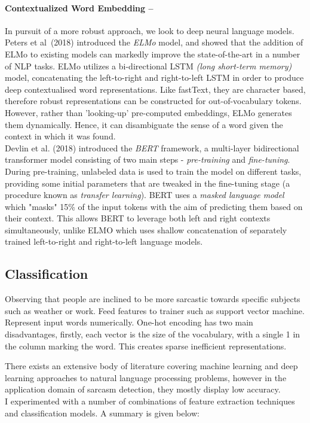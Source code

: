 \documentclass[12pt,a4paper]{article}
\begin{document}
\paragraph{Contextualized Word Embedding --}
In pursuit of a more robust approach, we look to deep neural language models. Peters et al\ (2018) \cite{peters2018deep} introduced the \textit{ELMo} model, and showed that the addition of ELMo to existing models can markedly improve the state-of-the-art in a number of NLP tasks. ELMo utilizes a bi-directional LSTM \textit{(long short-term memory)} model, concatenating the left-to-right and right-to-left LSTM in order to produce deep contextualised word representations. Like fastText, they are character based, therefore robust representations can be constructed for out-of-vocabulary tokens. However, rather than 'looking-up' pre-computed embeddings, ELMo generates them dynamically. Hence, it can disambiguate the sense of a word given the context in which it was found.\\
Devlin et al. (2018) \cite{devlin2018bert} introduced the \textit{BERT} framework, a multi-layer bidirectional transformer model consisting of two main steps - \textit{pre-training} and \textit{fine-tuning}. During pre-training, unlabeled data is used to train the model on different tasks, providing some initial parameters that are tweaked in the fine-tuning stage (a procedure known as \textit{transfer learning}). BERT uses a \textit{masked language model} which "masks" 15\% of the input tokens with the aim of predicting them based on their context. This allows BERT to leverage both left and right contexts simultaneously, unlike ELMO which uses shallow concatenation of separately trained left-to-right and right-to-left language models. 


\subsection{Classification}
\noindent 
Observing that people are inclined to be more sarcastic towards specific subjects such as weather or work.
Feed features to trainer such as support vector machine.
Represent input words numerically.
One-hot encoding has two main disadvantages, firstly, each vector is the size of the vocabulary, with a single 1 in the column marking the word. This creates sparse inefficient representations.


\noindent There exists an extensive body of literature covering machine learning and deep learning approaches to natural language processing problems, however in the application domain of sarcasm detection, they mostly display low accuracy.\\
I experimented with a number of combinations of feature extraction techniques and classification models. A summary is given below:
\end{document}
